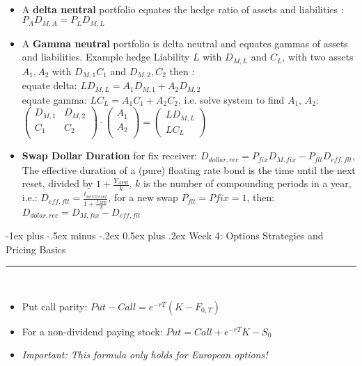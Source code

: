 \documentclass[10pt,landscape,a4paper]{article}
\makeatletter
\renewcommand{\section}{\@startsection{section}{1}{0mm}%
                                {-1ex plus -.5ex minus -.2ex}%
                                {0.5ex plus .2ex}%
                                {\normalfont\large\bfseries}}
\makeatother
\begin{document}
\begin{multicols*}{3}
\begin{description}[topsep=0pt]
	\item[Delta/Gamma Hedging] ~
	\begin{itemize}[topsep=0pt]
		\item A \textbf{delta neutral} portfolio equates the hedge ratio of assets and liabilities : $P_{A}D_{M,A} = P_{L}D_{M,L}$
		\item A \textbf{Gamma neutral } portfolio is delta neutral and equates gammas of assets and liabilities. Example hedge Liability $L$ with $D_{M,L}$ and $C_L$, with two assets $A_1, A_2$ with $D_{M,1}  C_1$ and  $D_{M,2}, C_2$ then : 
		\\ equate delta:  $L D_{M,L} = A_1 D_{M,1}+ A_2 D_{M,2}$ 
		\\ equate gamma: $L C_L = A_1 C_1 + A_2 C_2$, i.e. solve system to find $A_1$, $A_2$:	
		$
		\begin{pmatrix}
			D_{M,1} & D_{M,2}  \\
			C_1 & C_2 \\						
		\end{pmatrix} \cdot 
		\begin{pmatrix}
			A_1 \\
			A_2 \\							
		\end{pmatrix}	
		=
		\begin{pmatrix}
			L D_{M,L}\\
			L C_L							
		\end{pmatrix}
		$
		\item \textbf{Swap Dollar Duration} for fix receiver: $D_{dollar,rec}=P_{fix}D_{M,fix} - P_{flt}D_{eff,flt}$,  The effective duration of a (pure) floating rate bond is the time until the next reset, divided by $1 + \frac{Y_{APR}}{k}$,  $k$ is the number of compounding periods in a year, i.e.: $D_{eff,flt} = \frac{t_{nextreset}}{1 + \frac{Y_{APR}}{k}}$, for a new swap $P_{flt}=P{fix}=1$, then:
		\\$D_{dolar,rec}=D_{M,fix} - D_{eff,flt}$
	\end{itemize}
\end{description}


\section{Week 4: Options Strategies and Pricing Basics}\smallskip \hrule height 1pt \smallskip
 
 
 \begin{description}[topsep=0pt]
 	\item[Option Basics] ~
 	\begin{itemize}[topsep=0pt]
 		\item Put call parity: $Put-Call=e^{-rT}(K-F_{0,T})$ 
 		\item For a non-dividend paying stock: $Put = Call + e^{-rT}K-S_0$
 		\item \textit{Important: This formula only holds for European options!}
 	\end{itemize}
 \end{description}
 

\end{multicols*}
\end{document}
